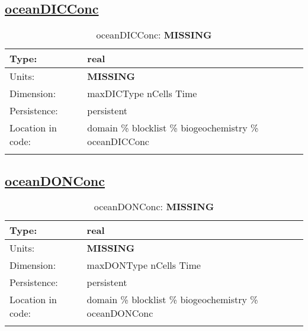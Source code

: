 \subsection[oceanDICConc]{\hyperref[sec:var_tab_biogeochemistry]{oceanDICConc}}
\label{subsec:var_sec_biogeochemistry_oceanDICConc}
\begin{center}
\begin{longtable}{| p{2.0in} | p{4.0in} |}
        \hline 
        Type: & real \\
        \hline 
        Units: & {\bf \color{red} MISSING} \\
        \hline 
        Dimension: & maxDICType nCells Time \\
        \hline 
        Persistence: & persistent \\
        \hline 
         Location in code: & domain \% blocklist \% biogeochemistry \% oceanDICConc \\
         \hline 
    \caption{oceanDICConc: {\bf \color{red} MISSING}}
\end{longtable}
\end{center}
\subsection[oceanDONConc]{\hyperref[sec:var_tab_biogeochemistry]{oceanDONConc}}
\label{subsec:var_sec_biogeochemistry_oceanDONConc}
\begin{center}
\begin{longtable}{| p{2.0in} | p{4.0in} |}
        \hline 
        Type: & real \\
        \hline 
        Units: & {\bf \color{red} MISSING} \\
        \hline 
        Dimension: & maxDONType nCells Time \\
        \hline 
        Persistence: & persistent \\
        \hline 
         Location in code: & domain \% blocklist \% biogeochemistry \% oceanDONConc \\
         \hline 
    \caption{oceanDONConc: {\bf \color{red} MISSING}}
\end{longtable}
\end{center}
